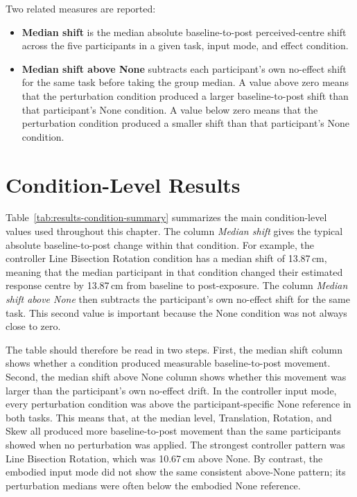 Two related measures are reported:

\begin{itemize}
    \item \textbf{Median shift} is the median absolute baseline-to-post perceived-centre shift across the five participants in a given task, input mode, and effect condition.
    \item \textbf{Median shift above None} subtracts each participant's own no-effect shift for the same task before taking the group median. A value above zero means that the perturbation condition produced a larger baseline-to-post shift than that participant's None condition. A value below zero means that the perturbation condition produced a smaller shift than that participant's None condition.
\end{itemize}

\section{Condition-Level Results}
\label{sec:results-condition-level}

Table~\ref{tab:results-condition-summary} summarizes the main condition-level values used throughout this chapter. The column \emph{Median shift} gives the typical absolute baseline-to-post change within that condition. For example, the controller Line Bisection Rotation condition has a median shift of 13.87\,cm, meaning that the median participant in that condition changed their estimated response centre by 13.87\,cm from baseline to post-exposure. The column \emph{Median shift above None} then subtracts the participant's own no-effect shift for the same task. This second value is important because the None condition was not always close to zero.

The table should therefore be read in two steps. First, the median shift column shows whether a condition produced measurable baseline-to-post movement. Second, the median shift above None column shows whether this movement was larger than the participant's own no-effect drift. In the controller input mode, every perturbation condition was above the participant-specific None reference in both tasks. This means that, at the median level, Translation, Rotation, and Skew all produced more baseline-to-post movement than the same participants showed when no perturbation was applied. The strongest controller pattern was Line Bisection Rotation, which was 10.67\,cm above None. By contrast, the embodied input mode did not show the same consistent above-None pattern; its perturbation medians were often below the embodied None reference.

